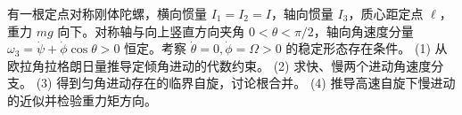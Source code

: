 有一根定点对称刚体陀螺，横向惯量 \(I_1=I_2=I\)，轴向惯量 \(I_3\)，质心距定点 \(\ell\)，重力 \(mg\) 向下。对称轴与向上竖直方向夹角 \(0<\theta<\pi/2\)，轴向角速度分量 \(\omega_3=\dot\psi+\dot\phi\cos\theta>0\) 恒定。考察 \(\dot\theta=0,\dot\phi=\Omega>0\) 的稳定形态存在条件。
(1) 从欧拉角拉格朗日量推导定倾角进动的代数约束。
(2) 求快、慢两个进动角速度分支。
(3) 得到匀角进动存在的临界自旋，讨论根合并。
(4) 推导高速自旋下慢进动的近似并检验重力矩方向。
